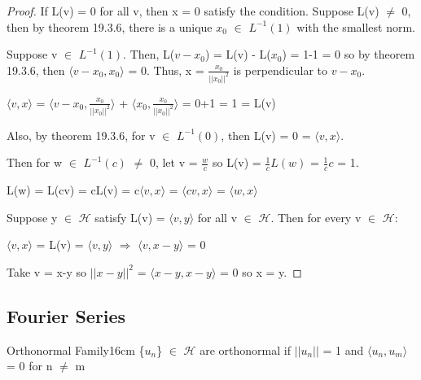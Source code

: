     \begin{proof}
        If L(v) = 0 for all v, then x = 0 satisfy the condition.
        Suppose L(v) $\not =$ 0, then by {\color{red} theorem 19.3.6},
        there is a unique $x_0$ $\in$ $L^{-1}(1)$ with the smallest norm.

        Suppose v $\in$ $L^{-1}(1)$.
        Then, L($v - x_0$) = L(v) - L($x_0$) = 1-1 = 0
        so by {\color{red} theorem 19.3.6},
        then $\langle v - x_0, x_0 \rangle$ = 0.
        Thus, x = $\frac{x_0}{||x_0||^2}$ is perpendicular to $v-x_0$.

        \hspace{0.5cm}
        $\langle v , x \rangle$
        = $\langle v-x_0 , \frac{x_0}{||x_0||^2} \rangle$
            + $\langle x_0 , \frac{x_0}{||x_0||^2} \rangle$
        = 0+1 = 1 = L(v)

        Also, by {\color{red} theorem 19.3.6}, for v $\in$ $L^{-1}(0)$,
        then L(v) = 0 = $\langle v , x \rangle$.

        Then for w $\in$ $L^{-1}(c)$ $\not =$ 0, let v = $\frac{w}{c}$
        so L(v) = $\frac{1}{c} L(w)$ = $\frac{1}{c} c$ = 1.

        \hspace{0.5cm}
        L(w) = L(cv) = cL(v) = c$\langle v , x \rangle$
        = $\langle cv , x \rangle$ = $\langle w , x \rangle$

        Suppose y $\in$ $\mathcal{H}$ satisfy L(v) = $\langle v , y \rangle$
        for all v $\in$ $\mathcal{H}$.
        Then for every v $\in$ $\mathcal{H}$:

        \hspace{0.5cm}
        $\langle v , x \rangle$
        = L(v) = $\langle v , y \rangle$
        \hspace{1cm}
        $\Rightarrow$
        \hspace{1cm}
        $\langle v , x-y \rangle$ = 0

        Take v = x-y so $||x-y||^2$ = $\langle x-y , x-y \rangle$ = 0
        so x = y.
    \end{proof}

    \newpage





\subsection{ Fourier Series }

    \begin{definition}{Orthonormal Family}{16cm}
        \{$u_n$\} $\in$ $\mathcal{H}$ are {\color{lblue} orthonormal}
        if $||u_n||$ = 1 and $\langle u_n , u_m \rangle$ = 0 for n $\not =$ m
    \end{definition}

